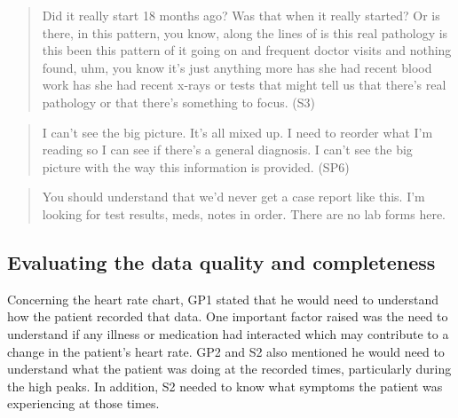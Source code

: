 \documentclass{sigchi}
\begin{document}
\begin{quote}
    Did it really start 18 months ago? Was that when it really started? Or is there, in this pattern, you know, along the lines of is this real pathology is this been this pattern of it going on and frequent doctor visits and nothing found, uhm, you know it's just anything more has she had recent blood work has she had recent x-rays or tests that might tell us that there's real pathology or that there's something to focus. (S3)
\end{quote}

\begin{quote}
I can't see the big picture.  It's all mixed up.  I need to reorder what I'm reading so I can see if there's a general diagnosis.  I can't see the big picture with the way this information is provided. (SP6)
\end{quote}

\begin{quote}
You should understand that we'd never get a case report like this.  I'm looking for test results, meds, notes in order.  There are no lab forms here.
\end{quote}






\subsection{Evaluating the data quality and completeness}

Concerning the heart rate chart, GP1 stated that he would need to understand how the patient recorded that data. One important factor raised was the need to understand if any illness or medication had interacted which may contribute to a change in the patient's heart rate. GP2 and S2 also mentioned he would need to understand what the patient was doing at the recorded times, particularly during the high peaks. In addition, S2 needed to know what symptoms the patient was experiencing at those times. 
\end{document}
